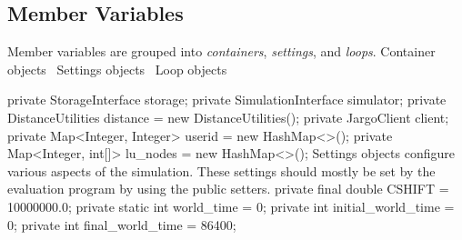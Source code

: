 \documentclass{article}
\newcommand{\hi}[1]{\noindent {\bf #1}}     %
\def\nwendcode{\endtrivlist \endgroup}      %
\let\nwdocspar=\par
\begin{document}
\subsection{Member Variables}
Member variables are grouped into \emph{containers}, \emph{settings}, and
\emph{loops}.
\nwenddocs{}\endmoddef{}
\LA{}Container objects~{\nwtagstyle{}}\RA{}
\LA{}Settings objects~{\nwtagstyle{}}\RA{}
\LA{}Loop objects~{\nwtagstyle{}}\RA{}
\nwendcode{}\nwdocspar
\hi{Containers.}
\nwenddocs{}\endmoddef{}
private StorageInterface storage;
private SimulationInterface simulator;
private DistanceUtilities distance = new DistanceUtilities();
private JargoClient client;
private Map<Integer, Integer> userid = new HashMap<>();
private Map<Integer, int[]> lu_nodes = new HashMap<>();
\eatline
{}\nwendcode{}\hi{Settings.} Settings objects configure various aspects of the simulation.
These settings should mostly be set by the evaluation program by using the public
setters.
\nwenddocs{}\endmoddef{}
private final double CSHIFT = 10000000.0;
private static int world_time = 0;
private int initial_world_time = 0;
private int final_world_time = 86400;
\end{document}
